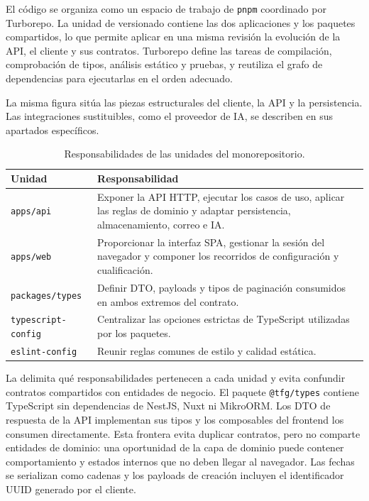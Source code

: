 El código se organiza como un espacio de trabajo de \texttt{pnpm} coordinado
por Turborepo. La unidad de versionado contiene las dos aplicaciones y los
paquetes compartidos, lo que permite aplicar en una misma revisión la
evolución de la API, el cliente y sus contratos. Turborepo define las tareas de
compilación, comprobación de tipos, análisis estático y pruebas, y reutiliza el
grafo de dependencias para ejecutarlas en el orden adecuado.

La misma figura sitúa las piezas estructurales del cliente, la API y la
persistencia. Las integraciones sustituibles, como el proveedor de IA, se
describen en sus apartados específicos.

\begin{table}[htbp]
  \centering
  \caption{Responsabilidades de las unidades del monorepositorio.}
  \label{tab:monorepo-units}
  \begin{tabular}{L{0.24\textwidth} L{0.68\textwidth}}
    \toprule
    \textbf{Unidad} & \textbf{Responsabilidad} \\
    \midrule
    \texttt{apps/api} & Exponer la API HTTP, ejecutar los casos de uso, aplicar las reglas de dominio y adaptar persistencia, almacenamiento, correo e IA. \\
    \texttt{apps/web} & Proporcionar la interfaz SPA, gestionar la sesión del navegador y componer los recorridos de configuración y cualificación. \\
    \texttt{packages/types} & Definir DTO, payloads y tipos de paginación consumidos en ambos extremos del contrato. \\
    \texttt{typescript-config} & Centralizar las opciones estrictas de TypeScript utilizadas por los paquetes. \\
    \texttt{eslint-config} & Reunir reglas comunes de estilo y calidad estática. \\
    \bottomrule
  \end{tabular}
\end{table}

La  delimita qué responsabilidades pertenecen a cada
unidad y evita confundir contratos compartidos con entidades de negocio. El
paquete \texttt{@tfg/types} contiene TypeScript sin dependencias de NestJS,
Nuxt ni MikroORM. Los DTO de respuesta de la API implementan sus tipos y los
composables del frontend los consumen directamente. Esta frontera evita
duplicar contratos, pero no comparte entidades de dominio: una oportunidad de
la capa de dominio puede contener comportamiento y estados internos que no
deben llegar al navegador. Las fechas se serializan como cadenas y los payloads
de creación incluyen el identificador UUID generado por el cliente.

